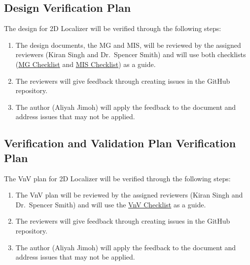 \documentclass[12pt, titlepage]{article}
\begin{document}


\subsection{Design Verification Plan}\label{plan_design}
The design for 2D Localizer will be verified through the following steps:
\begin{enumerate}
  \item The design documents, the MG and MIS, will be reviewed by the assigned reviewers (Kiran Singh and Dr.~Spencer Smith) and will use both checklists (\href{https://github.com/AliyahJimoh/2D-Localizer/blob/main/docs/Checklists/MG-Checklist.pdf}{MG Checklist} and \href{https://github.com/AliyahJimoh/2D-Localizer/blob/main/docs/Checklists/MIS-Checklist.pdf}{MIS Checklist}) as a guide.
  \item The reviewers will give feedback through creating issues in the GitHub repository.
  \item The author (Aliyah Jimoh) will apply the feedback to the document and address issues that may not be applied.
\end{enumerate}




\subsection{Verification and Validation Plan Verification Plan}\label{plan_verification}

The VnV plan for 2D Localizer will be verified through the following steps:
\begin{enumerate}
  \item The VnV plan will be reviewed by the assigned reviewers (Kiran Singh and Dr.~Spencer Smith) and will use the \href{https://github.com/AliyahJimoh/2D-Localizer/blob/main/docs/Checklists/VnV-Checklist.pdf}{VnV Checklist} as a guide.
  \item The reviewers will give feedback through creating issues in the GitHub repository.
  \item The author (Aliyah Jimoh) will apply the feedback to the document and address issues that may not be applied.
\end{enumerate}
\end{document}
